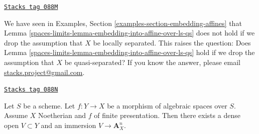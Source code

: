 \begin{remark}
\label{spaces-limits-remark-cannot-embed-in-general}
\href{https://stacks.math.columbia.edu/tag/088M}{\texttt{Stacks tag 088M}}

We have seen in Examples, Section \ref{examples-section-embedding-affines}
that Lemma \ref{spaces-limits-lemma-embedding-into-affine-over-ls-qs}
does not hold if we drop the assumption that $X$ be locally separated.
This raises the question: Does
Lemma \ref{spaces-limits-lemma-embedding-into-affine-over-ls-qs}
hold if we drop the assumption that $X$ be quasi-separated?
If you know the answer, please email
\href{mailto:stacks.project@gmail.com}{stacks.project@gmail.com}.
\end{remark}

\begin{lemma}
\label{spaces-limits-lemma-embedding-into-affine-over-qs}
\href{https://stacks.math.columbia.edu/tag/088N}{\texttt{Stacks tag 088N}}

Let $S$ be a scheme. Let $f : Y \to X$ be a morphism of algebraic
spaces over $S$. Assume $X$ Noetherian and $f$ of finite presentation.
Then there exists a dense open $V \subset Y$ and an immersion
$V \to \mathbf{A}^n_X$.
\end{lemma}

